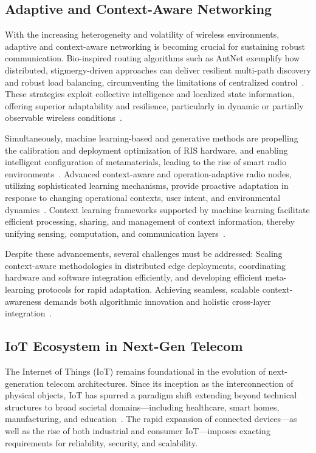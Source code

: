 \documentclass[sigconf]{acmart}
\begin{document}
\subsection{Adaptive and Context-Aware Networking}

With the increasing heterogeneity and volatility of wireless environments, adaptive and context-aware networking is becoming crucial for sustaining robust communication. Bio-inspired routing algorithms such as AntNet exemplify how distributed, stigmergy-driven approaches can deliver resilient multi-path discovery and robust load balancing, circumventing the limitations of centralized control~\cite{ref30}. These strategies exploit collective intelligence and localized state information, offering superior adaptability and resilience, particularly in dynamic or partially observable wireless conditions~\cite{ref30}.

Simultaneously, machine learning-based and generative methods are propelling the calibration and deployment optimization of RIS hardware, and enabling intelligent configuration of metamaterials, leading to the rise of smart radio environments~\cite{ref27,ref39}. Advanced context-aware and operation-adaptive radio nodes, utilizing sophisticated learning mechanisms, provide proactive adaptation in response to changing operational contexts, user intent, and environmental dynamics~\cite{ref28}. Context learning frameworks supported by machine learning facilitate efficient processing, sharing, and management of context information, thereby unifying sensing, computation, and communication layers~\cite{ref28,ref30}.

Despite these advancements, several challenges must be addressed:
Scaling context-aware methodologies in distributed edge deployments,
coordinating hardware and software integration efficiently,
and developing efficient meta-learning protocols for rapid adaptation.
Achieving seamless, scalable context-awareness demands both algorithmic innovation and holistic cross-layer integration~\cite{ref27,ref28,ref39}.

\subsection{IoT Ecosystem in Next-Gen Telecom}

The Internet of Things (IoT) remains foundational in the evolution of next-generation telecom architectures. Since its inception as the interconnection of physical objects, IoT has spurred a paradigm shift extending beyond technical structures to broad societal domains—including healthcare, smart homes, manufacturing, and education~\cite{ref45}. The rapid expansion of connected devices—as well as the rise of both industrial and consumer IoT—imposes exacting requirements for reliability, security, and scalability.
\end{document}
